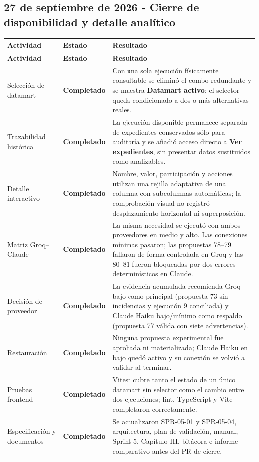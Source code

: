 \documentclass[11pt,letterpaper]{article}
\newcommand{\statusok}{\textcolor{deepgreen}{\textbf{Completado}}}
\begin{document}
\subsection{27 de septiembre de 2026 - Cierre de disponibilidad y detalle analítico}

\begin{longtable}{@{}p{}p{}p{}@{}}
  \toprule
  \textbf{Actividad} & \textbf{Estado} & \textbf{Resultado} \\
  \midrule
  \endfirsthead
  \toprule
  \textbf{Actividad} & \textbf{Estado} & \textbf{Resultado} \\
  \midrule
  \endhead
  Selección de datamart & \statusok & Con una sola ejecución físicamente consultable se eliminó el combo redundante y se muestra \textbf{Datamart activo}; el selector queda condicionado a dos o más alternativas reales. \\
  Trazabilidad histórica & \statusok & La ejecución disponible permanece separada de expedientes conservados sólo para auditoría y se añadió acceso directo a \textbf{Ver expedientes}, sin presentar datos sustituidos como analizables. \\
  Detalle interactivo & \statusok & Nombre, valor, participación y acciones utilizan una rejilla adaptativa de una columna con subcolumnas automáticas; la comprobación visual no registró desplazamiento horizontal ni superposición. \\
  Matriz Groq--Claude & \statusok & La misma necesidad se ejecutó con ambos proveedores en medio y alto. Las conexiones mínimas pasaron; las propuestas 78--79 fallaron de forma controlada en Groq y las 80--81 fueron bloqueadas por dos errores determinísticos en Claude. \\
  Decisión de proveedor & \statusok & La evidencia acumulada recomienda Groq bajo como principal (propuesta 73 sin incidencias y ejecución 9 conciliada) y Claude Haiku bajo/mínimo como respaldo (propuesta 77 válida con siete advertencias). \\
  Restauración & \statusok & Ninguna propuesta experimental fue aprobada ni materializada; Claude Haiku en bajo quedó activo y su conexión se volvió a validar al terminar. \\
  Pruebas frontend & \statusok & Vitest cubre tanto el estado de un único datamart sin selector como el cambio entre dos ejecuciones; lint, TypeScript y Vite completaron correctamente. \\
  Especificación y documentos & \statusok & Se actualizaron SPR-05-01 y SPR-05-04, arquitectura, plan de validación, manual, Sprint 5, Capítulo III, bitácora e informe comparativo antes del PR de cierre. \\
  \bottomrule
\end{longtable}
\end{document}

